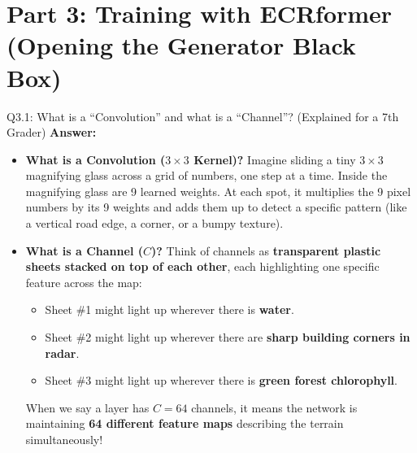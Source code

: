 \documentclass[11pt,a4paper]{article}
\begin{document}
\newpage

\section{Part 3: Training with ECRformer (Opening the Generator Black Box)}

\begin{qbox}{Q3.1: What is a ``Convolution'' and what is a ``Channel''? (Explained for a 7th Grader)}
\textbf{Answer:}
\begin{itemize}[leftmargin=18pt]
    \item \textbf{What is a Convolution ($3\times 3$ Kernel)?} Imagine sliding a tiny $3\times 3$ magnifying glass across a grid of numbers, one step at a time. Inside the magnifying glass are 9 learned weights. At each spot, it multiplies the 9 pixel numbers by its 9 weights and adds them up to detect a specific pattern (like a vertical road edge, a corner, or a bumpy texture).
    \item \textbf{What is a Channel ($C$)?} Think of channels as \textbf{transparent plastic sheets stacked on top of each other}, each highlighting one specific feature across the map:
    \begin{itemize}
        \item Sheet \#1 might light up wherever there is \textbf{water}.
        \item Sheet \#2 might light up wherever there are \textbf{sharp building corners in radar}.
        \item Sheet \#3 might light up wherever there is \textbf{green forest chlorophyll}.
    \end{itemize}
    When we say a layer has $C=64$ channels, it means the network is maintaining \textbf{64 different feature maps} describing the terrain simultaneously!
\end{itemize}
\end{qbox}
\end{document}
